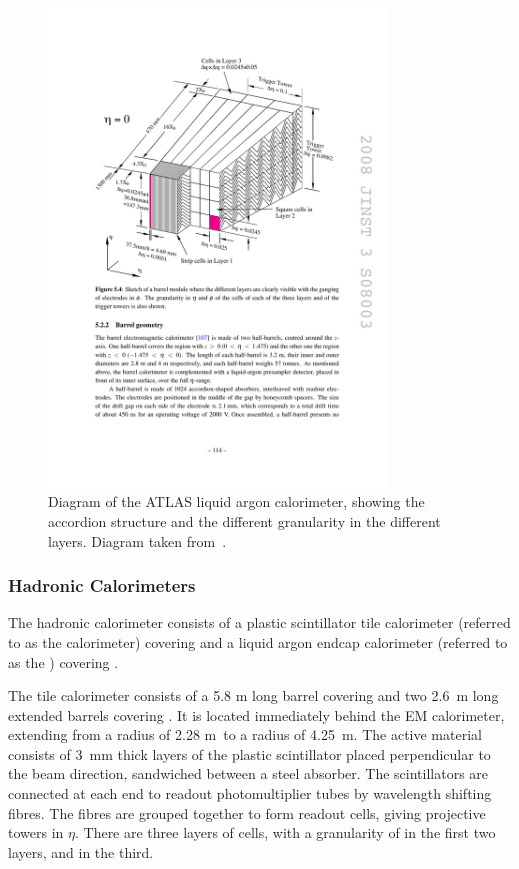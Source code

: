 \begin{figure}[h]
\centering
\includegraphics[width=0.8\textwidth]{lar-diagram}
\caption{Diagram of the ATLAS liquid argon calorimeter, showing the accordion
structure and the different granularity in the different layers. Diagram taken
from~\cite{1748-0221-3-08-S08003}.}
\label{fig:lar-diagram}
\end{figure}

\subsubsection{Hadronic Calorimeters}

The hadronic calorimeter consists of a plastic scintillator tile calorimeter 
(referred to as the  calorimeter) covering  and a liquid
argon endcap calorimeter (referred to as the ) covering
. 

The tile calorimeter consists of a 5.8 m long barrel covering
 and two 2.6~m long extended barrels covering
.
It is located immediately behind the EM calorimeter, extending from a radius of
2.28 m~to a radius of 4.25~m. The active material consists of 3~mm thick layers of the plastic scintillator 
placed perpendicular to the beam direction, sandwiched between a steel absorber.
The scintillators are connected at each end to
readout photomultiplier tubes by wavelength shifting fibres. The fibres are grouped
together to form readout cells, giving projective towers in $\eta$. There are
three layers of cells, with a granularity of  in the
first two layers, and  in the third.

